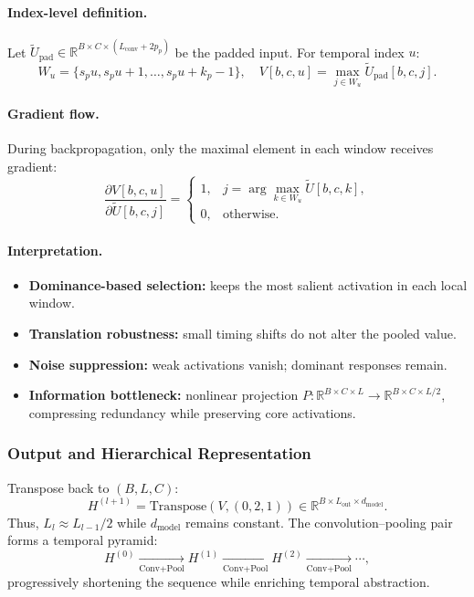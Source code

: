 \documentclass[11pt]{article}
\begin{document}
\paragraph{Index-level definition.}
Let $\tilde{U}_{\text{pad}}\in\mathbb{R}^{B\times C\times(L_{\text{conv}}+2p_p)}$ be the padded input.
For temporal index $u$:
\[
W_u = \{s_p u, s_p u+1, \ldots, s_p u+k_p-1\},\quad
V[b,c,u] = \max_{j\in W_u} \tilde{U}_{\text{pad}}[b,c,j].
\]

\paragraph{Gradient flow.}
During backpropagation, only the maximal element in each window receives gradient:
\[
\frac{\partial V[b,c,u]}{\partial \tilde{U}[b,c,j]} =
\begin{cases}
1, & j = \arg\max_{k\in W_u}\tilde{U}[b,c,k],\\
0, & \text{otherwise.}
\end{cases}
\]

\paragraph{Interpretation.}
\begin{itemize}
  \item \textbf{Dominance-based selection:} keeps the most salient activation in each local window.
  \item \textbf{Translation robustness:} small timing shifts do not alter the pooled value.
  \item \textbf{Noise suppression:} weak activations vanish; dominant responses remain.
  \item \textbf{Information bottleneck:} nonlinear projection
  $P:\mathbb{R}^{B\times C\times L} \!\to\! \mathbb{R}^{B\times C\times L/2}$,
  compressing redundancy while preserving core activations.
\end{itemize}

\subsubsection{Output and Hierarchical Representation}

Transpose back to $(B,L,C)$:
\[
H^{(l+1)} = \mathrm{Transpose}(V,(0,2,1))
             \in \mathbb{R}^{B\times L_{\text{out}}\times d_{\text{model}}}.
\]
Thus, $L_{l} \approx L_{l-1}/2$ while $d_{\text{model}}$ remains constant.
The convolution--pooling pair forms a temporal pyramid:
\[
H^{(0)} 
  \xrightarrow[\text{Conv+Pool}]{}
H^{(1)} 
  \xrightarrow[\text{Conv+Pool}]{}
H^{(2)}
  \xrightarrow[\text{Conv+Pool}]{}
\cdots,
\]
progressively shortening the sequence while enriching temporal abstraction.
\end{document}

